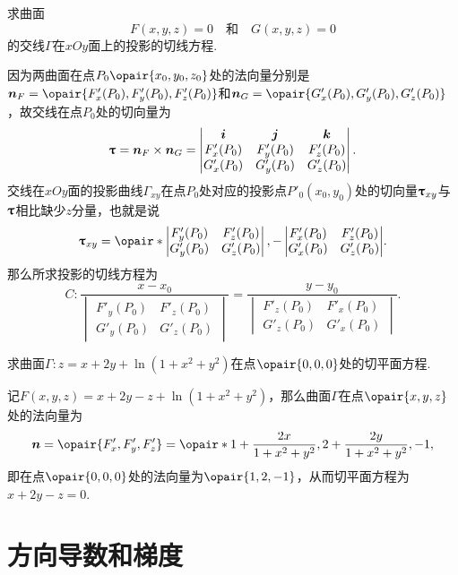 \begin{example}
求曲面\[
F(x,y,z) = 0
\quad\text{和}\quad
G(x,y,z) = 0
\]的交线\(\Gamma\)在\(xOy\)面上的投影的切线方程.
\begin{solution}
因为两曲面在点\(P_0\opair{x_0,y_0,z_0}\)处的法向量分别是\(\mat{n}_F = \opair{F'_x(P_0),F'_y(P_0),F'_z(P_0)}\)和\(\mat{n}_G = \opair{G'_x(P_0),G'_y(P_0),G'_z(P_0)}\)，故交线在点\(P_0\)处的切向量为\[
\boldsymbol{\uptau}
= \boldsymbol{n}_F \times \boldsymbol{n}_G
= \begin{vmatrix}
\boldsymbol{i} & \boldsymbol{j} & \boldsymbol{k} \\
F'_x(P_0) & F'_y(P_0) & F'_z(P_0) \\
G'_x(P_0) & G'_y(P_0) & G'_z(P_0)
\end{vmatrix}.
\]交线在\(xOy\)面的投影曲线\(\Gamma_{xy}\)在点\(P_0\)处对应的投影点\(P'_0(x_0,y_0)\)处的切向量\(\boldsymbol{\uptau}_{xy}\)与\(\boldsymbol{\uptau}\)相比缺少\(z\)分量，也就是说\[
\mat{\tau}_{xy} = \opair*{\begin{vmatrix}
F'_y(P_0) & F'_z(P_0) \\
G'_y(P_0) & G'_z(P_0)
\end{vmatrix}, -\begin{vmatrix}
F'_x(P_0) & F'_z(P_0) \\
G'_x(P_0) & G'_z(P_0)
\end{vmatrix}}.
\]那么所求投影的切线方程为\[
C: \frac{x - x_0}{\begin{vmatrix}
F'_y(P_0) & F'_z(P_0) \\
G'_y(P_0) & G'_z(P_0)
\end{vmatrix}} = \frac{y - y_0}{\begin{vmatrix}
F'_z(P_0) & F'_x(P_0) \\
G'_z(P_0) & G'_x(P_0)
\end{vmatrix}}.
\]
\end{solution}
\end{example}

\begin{example}
求曲面\(\Gamma: z = x + 2y + \ln(1+x^2+y^2)\)在点\(\opair{0,0,0}\)处的切平面方程.
\begin{solution}
记\(F(x,y,z) = x + 2y - z + \ln(1+x^2+y^2)\)，那么曲面\(\Gamma\)在点\(\opair{x,y,z}\)处的法向量为\[
\mat{n} = \opair{F'_x,F'_y,F'_z}
= \opair*{
1 + \frac{2x}{1+x^2+y^2},
2 + \frac{2y}{1+x^2+y^2},
-1
},
\]即在点\(\opair{0,0,0}\)处的法向量为\(\opair{1,2,-1}\)，从而切平面方程为\(x+2y-z=0\).
\end{solution}
\end{example}

\section{方向导数和梯度}

